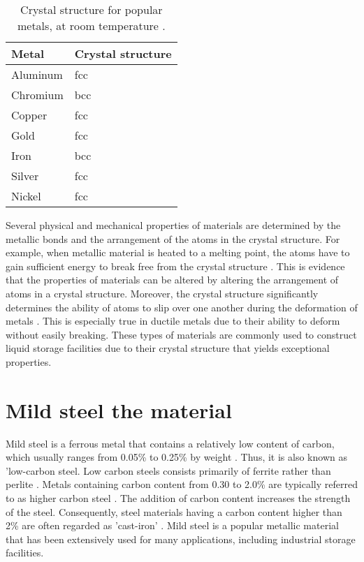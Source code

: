 \begin{table}[H]
\caption{Crystal structure for popular metals, at room temperature \cite{hench2005biomaterials}.}

\centering
\begin{tabularx}{.8\textwidth}{ XX }
    \hline
    Metal & Crystal structure \\
    \hline
    Aluminum & \acrshort{fcc} \\
    Chromium & \acrshort{bcc} \\
    Copper & \acrshort{fcc} \\
    Gold & \acrshort{fcc} \\
    Iron & \acrshort{bcc} \\
    Silver & \acrshort{fcc} \\
    Nickel & \acrshort{fcc} \\
    \hline
\end{tabularx}

\label{ch3:table:structure}
\end{table}

Several physical and mechanical properties of materials are determined by the metallic bonds and the arrangement of the atoms in the crystal structure. For example, when metallic material is heated to a melting point, the atoms have to gain sufficient energy to break free from the crystal structure \cite{hench2005biomaterials}. This is evidence that the properties of materials can be altered by altering the arrangement of atoms in a crystal structure. Moreover, the crystal structure significantly determines the ability of atoms to slip over one another during the deformation of metals \cite{callister2018materials}. This is especially true in ductile metals due to their ability to deform without easily breaking. These types of materials are commonly used to construct liquid storage facilities due to their crystal structure that yields exceptional properties.

\section{Mild steel the material}
Mild steel is a ferrous metal that contains a relatively low content of carbon, which usually ranges from 0.05\% to 0.25\% by weight \cite{callister2018materials}. Thus, it is also known as 'low-carbon steel.  Low carbon steels consists primarily of ferrite rather than perlite \cite{li2018effect}. Metals containing carbon content from 0.30 to 2.0\% are typically referred to as higher carbon steel \cite{timings2008fabrication}. The addition of carbon content increases the strength of the steel. Consequently, steel materials having a carbon content higher than 2\% are often regarded as 'cast-iron' \cite{callister2018materials}.  Mild steel is a popular metallic material that has been extensively used for many applications, including industrial storage facilities.

